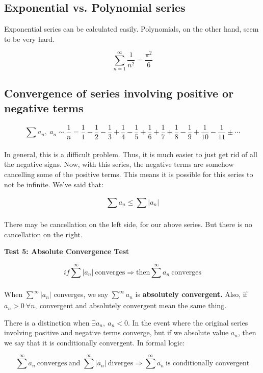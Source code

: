 \documentclass[12pt]{article}
\theoremstyle{plain}
\theoremstyle{remark}
\theoremstyle{definition}
\begin{document}
\subsection{Exponential vs. Polynomial
series}

Exponential series can be calculated easily. Polynomials, on the other
hand, seem to be very hard.

\[\sum_{n = 1}^{\infty}\frac{1}{n^{2}} = \frac{\pi^{2}}{6}\]


\subsection{Convergence of series involving positive or negative
terms}

\[\sum_{}^{}a_{n},\ a_{n}\sim\frac{1}{n} = \frac{1}{1} - \frac{1}{2} - \frac{1}{3} + \frac{1}{4} - \frac{1}{5} + \frac{1}{6} + \frac{1}{7} + \frac{1}{8} - \frac{1}{9} + \frac{1}{10} - \frac{1}{11} \pm \cdots\]

In general, this is a difficult problem. Thus, it is much easier to just
get rid of all the negative signs. Now, with this series, the negative
terms are somehow cancelling some of the positive terms. This means it
is possible for this series to not be infinite. We've said that:

\[\sum_{}^{}a_{n} \leq \sum_{}^{}\left| a_{n} \right|\]

There may be cancellation on the left side, for our above series. But
there is no cancellation on the right.

\textbf{Test 5: Absolute Convergence Test}

\[if\sum_{}^{\infty}\left| a_{n} \right|\ \text{converges} \Rightarrow \text{then}\sum_{}^{\infty}a_{n}\ \text{converges}\]

When \(\sum_{}^{\infty}\left| a_{n} \right|\) converges, we say
\(\sum_{}^{\infty}a_{n}\) is \textbf{absolutely convergent.} Also, if
\(a_{n} > 0\ \forall n,\ \)convergent and absolutely convergent mean the
same thing.

There is a distinction when \(\exists a_{n},\ a_{n} < 0\). In the event
where the original series involving positive and negative terms
converge, but if we absolute value \(a_{n}\), then we say that it is
conditionally convergent. In formal logic:

\[{\sum_{}^{\infty}a_{n}\ \text{converges}\ \text{and\ }\sum_{}^{\infty}\left| a_{n} \right|\ \text{diverges} }{\Rightarrow \sum_{}^{\infty}a_{n}\ \text{is\ conditionally\ convergent}} \]
\end{document}
